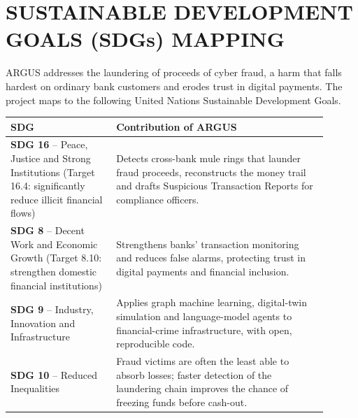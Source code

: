 \chapter*{SUSTAINABLE DEVELOPMENT GOALS (SDGs) MAPPING}

ARGUS addresses the laundering of proceeds of cyber fraud, a harm that falls hardest on ordinary bank customers and erodes trust in digital payments. The project maps to the following United Nations Sustainable Development Goals.

\begin{center}
\renewcommand{\arraystretch}{1.35}
\begin{tabular}{|p{0.30\linewidth}|p{0.60\linewidth}|}
\hline
\textbf{SDG} & \textbf{Contribution of ARGUS} \\ \hline
\textbf{SDG 16} -- Peace, Justice and Strong Institutions (Target 16.4: significantly reduce illicit financial flows) & Detects cross-bank mule rings that launder fraud proceeds, reconstructs the money trail and drafts Suspicious Transaction Reports for compliance officers. \\ \hline
\textbf{SDG 8} -- Decent Work and Economic Growth (Target 8.10: strengthen domestic financial institutions) & Strengthens banks' transaction monitoring and reduces false alarms, protecting trust in digital payments and financial inclusion. \\ \hline
\textbf{SDG 9} -- Industry, Innovation and Infrastructure & Applies graph machine learning, digital-twin simulation and language-model agents to financial-crime infrastructure, with open, reproducible code. \\ \hline
\textbf{SDG 10} -- Reduced Inequalities & Fraud victims are often the least able to absorb losses; faster detection of the laundering chain improves the chance of freezing funds before cash-out. \\ \hline
\end{tabular}
\end{center}

